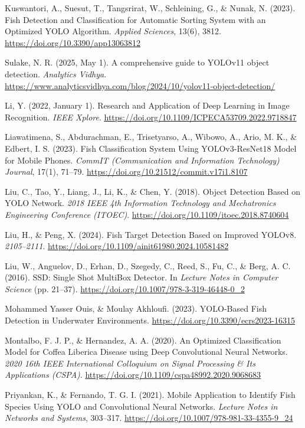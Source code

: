\begin{bibliography}
 Kuswantori, A., Suesut, T., Tangsrirat, W., Schleining, G., \& Nunak, N. (2023). Fish Detection and Classification for Automatic Sorting System with an Optimized YOLO Algorithm. \textit{Applied Sciences}, 13(6), 3812. \url{https://doi.org/10.3390/app13063812}

 Sulake, N. R. (2025, May 1). A comprehensive guide to YOLOv11 object detection. \textit{Analytics Vidhya}. \url{https://www.analyticsvidhya.com/blog/2024/10/yolov11-object-detection/}

 Li, Y. (2022, January 1). Research and Application of Deep Learning in Image Recognition. \textit{IEEE Xplore}. \url{https://doi.org/10.1109/ICPECA53709.2022.9718847}

 Liawatimena, S., Abdurachman, E., Trisetyarso, A., Wibowo, A., Ario, M. K., \& Edbert, I. S. (2023). Fish Classification System Using YOLOv3-ResNet18 Model for Mobile Phones. \textit{CommIT (Communication and Information Technology) Journal}, 17(1), 71–79. \url{https://doi.org/10.21512/commit.v17i1.8107}

 Liu, C., Tao, Y., Liang, J., Li, K., \& Chen, Y. (2018). Object Detection Based on YOLO Network. \textit{2018 IEEE 4th Information Technology and Mechatronics Engineering Conference (ITOEC)}. \url{https://doi.org/10.1109/itoec.2018.8740604}

 Liu, H., \& Peng, X. (2024). Fish Target Detection Based on Improved YOLOv8. \textit{2105–2111}. \url{https://doi.org/10.1109/ainit61980.2024.10581482}

 Liu, W., Anguelov, D., Erhan, D., Szegedy, C., Reed, S., Fu, C., \& Berg, A. C. (2016). SSD: Single Shot MultiBox Detector. In \textit{Lecture Notes in Computer Science} (pp. 21–37). \url{https://doi.org/10.1007/978-3-319-46448-0_2}

 Mohammed Yasser Ouis, \& Moulay Akhloufi. (2023). YOLO-Based Fish Detection in Underwater Environments. \url{https://doi.org/10.3390/ecrs2023-16315}

 Montalbo, F. J. P., \& Hernandez, A. A. (2020). An Optimized Classification Model for Coffea Liberica Disease using Deep Convolutional Neural Networks. \textit{2020 16th IEEE International Colloquium on Signal Processing \& Its Applications (CSPA)}. \url{https://doi.org/10.1109/cspa48992.2020.9068683}

 Priyankan, K., \& Fernando, T. G. I. (2021). Mobile Application to Identify Fish Species Using YOLO and Convolutional Neural Networks. \textit{Lecture Notes in Networks and Systems}, 303–317. \url{https://doi.org/10.1007/978-981-33-4355-9_24}


\end{bibliography}
